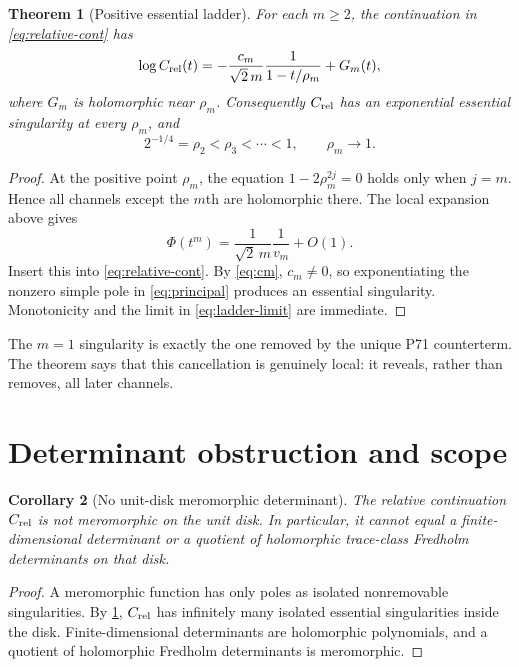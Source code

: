 \documentclass[11pt]{article}
\newtheorem{theorem}{Theorem}[section]
\newtheorem{corollary}[theorem]{Corollary}
\newcommand{\PhiF}{\Phi}
\begin{document}
\begin{theorem}[Positive essential ladder]\label{thm:ladder}
For each $m\ge2$, the continuation in \eqref{eq:relative-cont} has
\begin{equation}\label{eq:principal}
 \log C_{\rm rel}(t)=
 -\frac{c_m}{\sqrt2\,m}\frac1{1-t/\rho_m}
 +G_m(t),
\end{equation}
where $G_m$ is holomorphic near $\rho_m$.  Consequently $C_{\rm rel}$ has
an exponential essential singularity at every $\rho_m$, and
\begin{equation}\label{eq:ladder-limit}
 2^{-1/4}=\rho_2<\rho_3<\cdots<1,\qquad \rho_m\longrightarrow1.
\end{equation}
\end{theorem}

\begin{proof}
At the positive point $\rho_m$, the equation
$1-2\rho_m^{2j}=0$ holds only when $j=m$.  Hence all channels except the
$m$th are holomorphic there.  The local expansion above gives
\[
 \PhiF(t^m)=\frac{1}{\sqrt2\,m}\frac1{v_m}+O(1).
\]
Insert this into \eqref{eq:relative-cont}.  By \eqref{eq:cm}, $c_m\ne0$,
so exponentiating the nonzero simple pole in \eqref{eq:principal} produces
an essential singularity.  Monotonicity and the limit in
\eqref{eq:ladder-limit} are immediate.
\end{proof}

The $m=1$ singularity is exactly the one removed by the unique P71
counterterm.  The theorem says that this cancellation is genuinely local:
it reveals, rather than removes, all later channels.

\section{Determinant obstruction and scope}

\begin{corollary}[No unit-disk meromorphic determinant]\label{cor:no-det}
The relative continuation $C_{\rm rel}$ is not meromorphic on the unit
disk.  In particular, it cannot equal a finite-dimensional determinant or
a quotient of holomorphic trace-class Fredholm determinants on that disk.
\end{corollary}

\begin{proof}
A meromorphic function has only poles as isolated nonremovable
singularities.  By \cref{thm:ladder}, $C_{\rm rel}$ has infinitely many
isolated essential singularities inside the disk.  Finite-dimensional
determinants are holomorphic polynomials, and a quotient of holomorphic
Fredholm determinants is meromorphic.
\end{proof}
\end{document}
